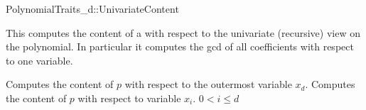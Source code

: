 \begin{ccRefConcept}{PolynomialTraits_d::UnivariateContent}

\ccDefinition

This  computes the content of a 
with respect to the univariate (recursive) view on the 
polynomial. In particular it computes the gcd of all 
coefficients  with respect to one variable. 

\ccRefines 
{}

\ccTypes

\ccGlue
{}\ccGlue
{}

\ccOperations
{}
         {Computes the content of $p$ with respect to the outermost variable $x_d$. }
         {Computes the content of $p$ with respect to variable $x_i$. 
          \ccPrecond $0<i \leq d$
         }


\ccSeeAlso

\\

\end{ccRefConcept}
